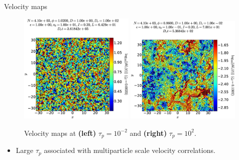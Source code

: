 \documentclass{beamer}
\begin{document}
\begin{frame}{Velocity maps}

\begin{figure}
\centering
\includegraphics[width=0.49\textwidth]{No4096_Fl1000_Vl0000_Tl1000_Rn1000_Dl1020_El0000.velo.eps}
\includegraphics[width=0.49\textwidth]{No4096_Fl1000_Vl0000_Tl1000_Rj1000_Dk8600_El0000.velo.eps}
\caption{Velocity maps at {\bf (left)} $\tau_p = 10^{-2}$ and {\bf (right)} $\tau_p = 10^2$.}
\end{figure}

\begin{itemize}
  \item Large $\tau_p$ associated with multiparticle scale velocity correlations.
\end{itemize}


\end{frame}
\end{document}
